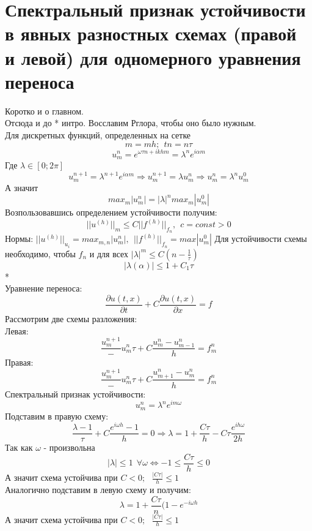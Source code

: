 \documentclass[__main__.tex]{subfiles}
\begin{document}
\section{Спектральный признак устойчивости в явных разностных схемах (правой и левой) для одномерного уравнения переноса}

Коротко и о главном.\\
Отсюда и до * интро. Восславим Рглора, чтобы оно было нужным.\\

Для дискретных функций, определенных на сетке
$$
m=mh;\ \ tn=n\tau
$$
$$u^n_m=e^{\omega\tau n+i k h m}=\lambda^n e^{i\alpha m}$$
Где $\lambda\in[0;2\pi]$
$$u^{n+1}_m=\lambda^{n+1} e^{i\alpha m}\Rightarrow u^{n+1}_m=\lambda u^n_m\Rightarrow u^n_m=\lambda^n u^0_m$$
А значит
$$max_m|u^n_m|=|\lambda|^n max_m|u^0_m|$$
Возпользовавшись определением устойчивости получим:
$$||u^{(h)}||_m\le C||f^{(h)}||_{f_n},\ \ c=const>0$$
Нормы: $||u^{(h)}||_{u_i}=max_{m,n}|u^n_m|,\ \ ||f^{(h)}||_{f_n}=max|u^0_m|$
Для устойчивости схемы необходимо, чтобы $f_n$ и для всех $|\lambda|^m\le C(n-\frac{1}{\tau})$
$$|\lambda(\alpha)| \le 1+C_1 \tau$$
*\\
Уравнение переноса: 
$$\frac{\partial u(t,x)}{\partial t}+C\frac{\partial u(t,x)}{\partial x}=f$$
Рассмотрим две схемы разложения:\\

Левая:$$\frac{u^{n+1}_m}-u^n_m{\tau}+C\frac{u^n_m-u^n_{m-1}}{h}=f^n_m$$
Правая:$$\frac{u^{n+1}_m}-u^n_m{\tau}+C\frac{u^n_{m+1}-u^n_{m}}{h}=f^n_m$$
Спектральный признак устойчивости:
$$u^n_m=\lambda^n e^{im\omega}$$
Подставим в правую схему:
$$\frac{\lambda-1}{\tau}+C\frac{e^{i\omega h}-1}{h}=0\Rightarrow\lambda=1+\frac{C\tau}{h}-C\tau \frac{e^{ih\omega}}{2h}$$
Так как $\omega$ - произвольна
$$|\lambda|\le 1 \ \ \forall \omega \Leftrightarrow -1\le \frac{C\tau}{h}\le 0$$
А значит схема устойчива при $C<0;\ \ \ \frac{|C\tau|}{h}\le 1$\\

Аналогично подставим в левую схему и получим:
$$\lambda=1+\frac{C\tau}{n}(1-e^{-i\omega h}$$
А значит схема устойчива при $C<0;\ \ \ \frac{|C\tau|}{h}\le 1$\\
\end{document}
